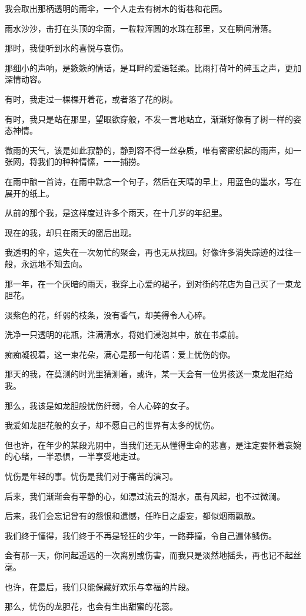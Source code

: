 \documentclass[12pt,a4paper]{article}
\begin{document}
		我会取出那柄透明的雨伞，一个人走去有树木的街巷和花园。\par
		雨水沙沙，击打在头顶的伞面，一粒粒浑圆的水珠在那里，又在瞬间滑落。\par
		那时，我便听到水的喜悦与哀伤。\par
		那细小的声响，是簌簌的情话，是耳畔的爱语轻柔。比雨打荷叶的碎玉之声，更加深情动容。

		有时，我走过一棵棵开着花，或者落了花的树。\par
		有时，我只是站在那里，望眼欲穿般，不发一言地站立，渐渐好像有了树一样的姿态神情。\par
		微雨的天气，该是如此寂静的，静到容不得一丝杂质，唯有密密织起的雨声，如一张网，将我们的种种情愫，一一捕捞。\par
		在雨中酿一首诗，在雨中默念一个句子，然后在天晴的早上，用蓝色的墨水，写在展开的纸上。\par
		从前的那个我，是这样度过许多个雨天，在十几岁的年纪里。

		现在的我，却只在雨天的窗后出现。\par
		我透明的伞，遗失在一次匆忙的聚会，再也无从找回。好像许多消失踪迹的过往一般，永远地不知去向。

		那一年，在一个灰暗的雨天，我穿上心爱的裙子，到对街的花店为自己买了一束龙胆花。\par
		淡紫色的花，纤弱的枝条，没有香气，却美得令人心碎。\par
		洗净一只透明的花瓶，注满清水，将她们浸泡其中，放在书桌前。\par
		痴痴凝视着，这一束花朵，满心是那一句花语：爱上忧伤的你。\par
		那天的我，在莫测的时光里猜测着，或许，某一天会有一位男孩送一束龙胆花给我。\par
		那么，我该是如龙胆般忧伤纤弱，令人心碎的女子。\par
		我爱如龙胆花般的女子，却不愿自己的世界有太多的忧伤。\par
		但也许，在年少的某段光阴中，当我们还无从懂得生命的悲喜，是注定要怀着哀婉的心绪，一半恐惧，一半享受地走过。

		忧伤是年轻的事。忧伤是我们对于痛苦的演习。

		后来，我们渐渐会有平静的心，如漂过流云的湖水，虽有风起，也不过微澜。\par
		后来，我们会忘记曾有的怨恨和遗憾，任昨日之虚妄，都似烟雨飘散。

		我们终于懂得，我们终于不再是轻狂的少年，一路莽撞，令自己遍体鳞伤。\par
		会有那一天，你问起遥远的一次离别或伤害，而我只是淡然地摇头，再也记不起丝毫。\par
		也许，在最后，我们只能保藏好欢乐与幸福的片段。\par
		那么，忧伤的龙胆花，也会有生出甜蜜的花蕊。
\end{document}
